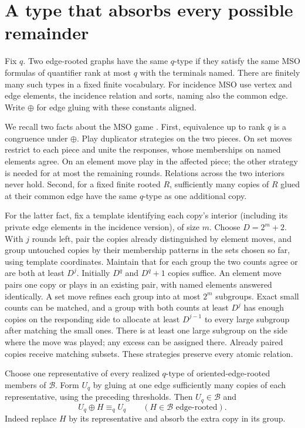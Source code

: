 \documentclass[11pt]{article}
\newcommand{\B}{\mathcal B}
\begin{document}
\section{A type that absorbs every possible remainder}
Fix $q$. Two edge-rooted graphs have the same $q$-type if they satisfy the same MSO formulas of quantifier rank at most $q$ with the terminals named. There are finitely many such types in a fixed finite vocabulary. For incidence MSO use vertex and edge elements, the incidence relation and sorts, naming also the common edge. Write $\oplus$ for edge gluing with these constants aligned.

We recall two facts about the MSO game \cite[\S\S2--3]{hmnt}. First, equivalence up to rank $q$ is a congruence under $\oplus$. Play duplicator strategies on the two pieces. On set moves restrict to each piece and unite the responses, whose memberships on named elements agree. On an element move play in the affected piece; the other strategy is needed for at most the remaining rounds. Relations across the two interiors never hold. Second, for a fixed finite rooted $R$, sufficiently many copies of $R$ glued at their common edge have the same $q$-type as one additional copy.

For the latter fact, fix a template identifying each copy's interior (including its private edge elements in the incidence version), of size $m$. Choose $D=2^m+2$. With $j$ rounds left, pair the copies already distinguished by element moves, and group untouched copies by their membership patterns in the sets chosen so far, using template coordinates. Maintain that for each group the two counts agree or are both at least $D^j$. Initially $D^q$ and $D^q+1$ copies suffice. An element move pairs one copy or plays in an existing pair, with named elements answered identically. A set move refines each group into at most $2^m$ subgroups. Exact small counts can be matched, and a group with both counts at least $D^j$ has enough copies on the responding side to allocate at least $D^{j-1}$ to every large subgroup after matching the small ones. There is at least one large subgroup on the side where the move was played; any excess can be assigned there. Already paired copies receive matching subsets. These strategies preserve every atomic relation.

Choose one representative of every realized $q$-type of oriented-edge-rooted members of $\B$. Form $U_q$ by gluing at one edge sufficiently many copies of each representative, using the preceding thresholds. Then $U_q\in\B$ and
\[
 U_q\oplus H\equiv_q U_q\qquad(H\in\B\text{ edge-rooted}).
\]
Indeed replace $H$ by its representative and absorb the extra copy in its group.
\end{document}
